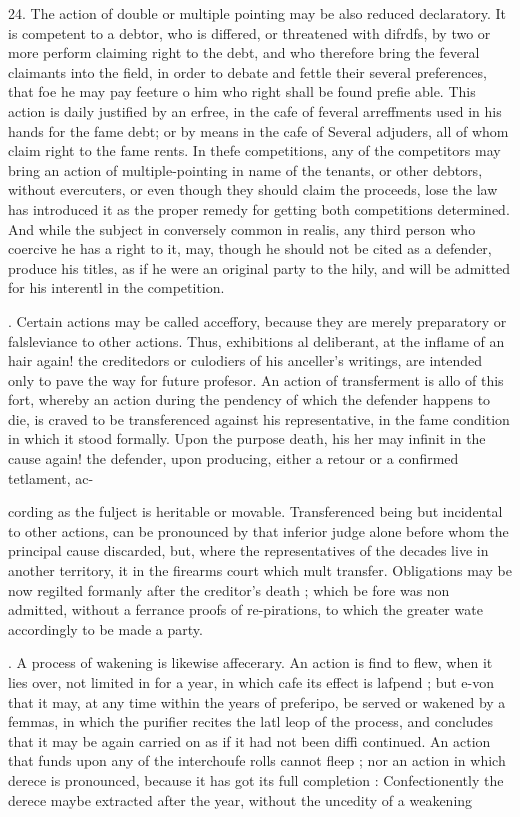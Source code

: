 24. The action of double or multiple pointing may be also reduced declaratory. It is competent to a debtor, who is differed, or threatened with difrdfs, by two or more perform claiming right to the debt, and who therefore bring the feveral claimants into the field, in order to debate and fettle their several preferences, that foe he may pay feeture o him who right shall be found prefie able. This action is daily justified by an erfree, in the cafe of feveral arreffments used in his hands for the fame debt; or by means in the cafe of Several adjuders, all of whom claim right to the fame rents. In thefe competitions, any of the competitors may bring an action of multiple-pointing in name of the tenants, or other debtors, without evercuters, or even though they should claim the proceeds, lose the law has introduced it as the proper remedy for getting both competitions determined. And while the subject in conversely common in realis, any third person who coercive he has a right to it, may, though he should not be cited as a defender, produce his titles, as if he were an original party to the hily, and will be admitted for his interentl in the competition.\par{}. Certain actions may be called acceffory, because they are merely preparatory or falsleviance to other actions. Thus, exhibitions al deliberant, at the inflame of an hair again! the creditedors or culodiers of his anceller's writings, are intended only to pave the way for future profesor. An action of transferment is allo of this fort, whereby an action during the pendency of which the defender happens to die, is craved to be transferenced against his representative, in the fame condition in which it stood formally. Upon the purpose death, his her may infinit in the cause again! the defender, upon producing, either a retour or a confirmed tetlament, ac-\par\medskip
cording as the fulject is heritable or movable. Transferenced being but incidental to other actions, can be pronounced by that inferior judge alone before whom the principal cause discarded, but, where the representatives of the decades live in another territory, it in the firearms court which mult transfer. Obligations may be now regilted formanly after the creditor's death ; which be fore was non admitted, without a ferrance proofs of re-pirations, to which the greater wate accordingly to be made a party.\par{}. A process of wakening is likewise affecerary. An action is find to flew, when it lies over, not limited in for a year, in which cafe its effect is lafpend ; but e-von that it may, at any time within the years of preferipo, be served or wakened by a femmas, in which the purifier recites the latl leop of the process, and concludes that it may be again carried on as if it had not been diffi continued. An action that funds upon any of the interchoufe rolls cannot fleep ; nor an action in which derece is pronounced, because it has got its full completion : Confectionently the derece maybe extracted after the year, without the uncedity of a weakening\par\medskip
